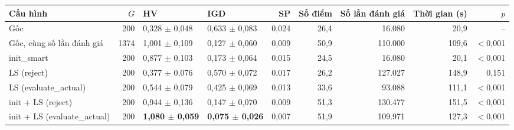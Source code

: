 \begin{tabular}{@{}lrllrrrrr@{}}
\toprule
Cấu hình & $G$ & HV & IGD & SP & Số điểm & Số lần đánh giá & Thời gian (s) & $p$ \\
\midrule
Gốc & 200 & 0{,}328 $\pm$ 0{,}048 & 0{,}633 $\pm$ 0{,}083 & 0{,}024 & 26{,}4 & 16.080 & 20{,}9 & -- \\
Gốc, cùng số lần đánh giá & 1374 & 1{,}001 $\pm$ 0{,}109 & 0{,}127 $\pm$ 0{,}060 & 0{,}009 & 50{,}9 & 110.000 & 109{,}6 & $<$0{,}001 \\
init\_smart & 200 & 0{,}877 $\pm$ 0{,}103 & 0{,}173 $\pm$ 0{,}064 & 0{,}015 & 24{,}5 & 16.080 & 20{,}1 & $<$0{,}001 \\
LS (reject) & 200 & 0{,}377 $\pm$ 0{,}076 & 0{,}570 $\pm$ 0{,}072 & 0{,}017 & 26{,}2 & 127.027 & 148{,}9 & 0{,}151 \\
LS (evaluate\_actual) & 200 & 0{,}544 $\pm$ 0{,}079 & 0{,}425 $\pm$ 0{,}069 & 0{,}013 & 33{,}6 & 93.088 & 111{,}1 & $<$0{,}001 \\
init + LS (reject) & 200 & 0{,}944 $\pm$ 0{,}136 & 0{,}147 $\pm$ 0{,}070 & 0{,}009 & 51{,}3 & 130.477 & 151{,}5 & $<$0{,}001 \\
init + LS (evaluate\_actual) & 200 & \textbf{1{,}080 $\pm$ 0{,}059} & \textbf{0{,}075 $\pm$ 0{,}026} & 0{,}007 & 51{,}9 & 109.971 & 127{,}3 & $<$0{,}001 \\
\bottomrule
\end{tabular}
